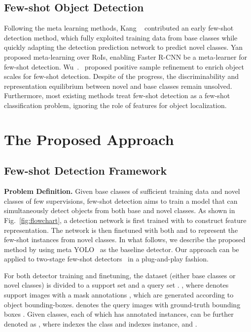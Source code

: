 \documentclass[final]{cvpr}
\begin{document}
\subsection{Few-shot Object Detection}
Following the meta learning methods, Kang \etal~\cite{FeatureReweighting} contributed an early few-shot detection method, which fully exploited training data from base classes while quickly adapting the detection prediction network to predict novel classes. Yan~\etal~\cite{MetaRCNN} proposed meta-learning over RoIs, enabling Faster R-CNN be a meta-learner for few-shot detection. 
Wu~\etal.~\cite{MPSR} proposed positive sample refinement to enrich object scales for few-shot detection. Despite of the progress, the discriminability and representation equilibrium between novel and base classes remain unsolved. Furthermore, most existing methods treat few-shot detection as a few-shot classification problem, ignoring the role of features for object localization. 

\section{The Proposed Approach}

\iffalse

\fi

\subsection{Few-shot Detection Framework}
\textbf{Problem Definition.}
Given base classes  of sufficient training data and novel classes  of few supervisions, few-shot detection aims to train a model that can simultaneously detect objects from both base and novel classes. As shown in Fig.\ \ref{fig:flowchart}, a detection network is first trained with  to construct feature representation. The network is then finetuned with both  and  to represent the few-shot instances from novel classes. In what follows, we describe the proposed method by using meta YOLO~\cite{FeatureReweighting} as the baseline detector. Our approach can be applied to two-stage few-shot detectors~\cite{MPSR} in a plug-and-play fashion.

For both detector training and finetuning, the dataset  (either base classes or novel classes) is divided to a support set  and a query set . , where  denotes support images with a mask annotations , which are generated according to object bounding-boxes.  denotes the query images with ground-truth bounding boxes . Given  classes, each of which has  annotated instances,   can be further denoted as , where  indexes the class and  indexes instance, and .
\end{document}
